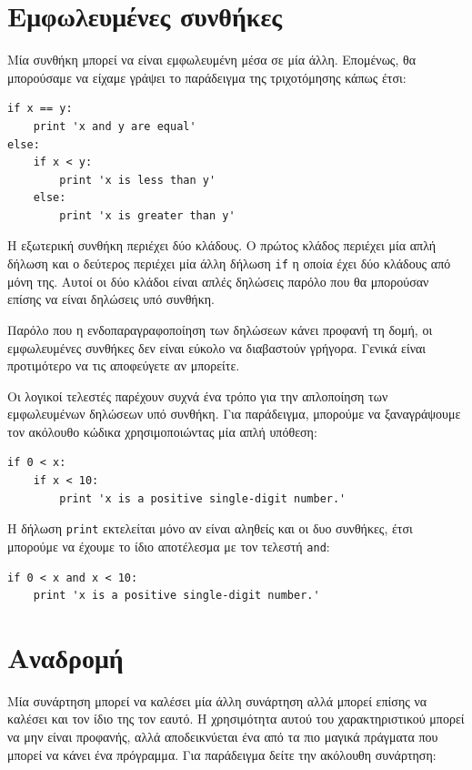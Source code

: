 \documentclass[10pt]{book}
\begin{document}
\section{Εμφωλευμένες συνθήκες}

Μία συνθήκη μπορεί να είναι εμφωλευμένη μέσα σε μία άλλη. Επομένως, θα μπορούσαμε να είχαμε γράψει το παράδειγμα της τριχοτόμησης κάπως έτσι:

\begin{verbatim}
if x == y:
    print 'x and y are equal'
else:
    if x < y:
        print 'x is less than y'
    else:
        print 'x is greater than y'
\end{verbatim}
%

Η εξωτερική συνθήκη περιέχει δύο κλάδους. Ο πρώτος κλάδος περιέχει μία απλή δήλωση και ο δεύτερος περιέχει μία άλλη δήλωση {\tt if} η οποία έχει δύο κλάδους από μόνη της. Αυτοί οι δύο κλάδοι είναι απλές δηλώσεις παρόλο που θα μπορούσαν επίσης να είναι δηλώσεις υπό συνθήκη.

Παρόλο που η ενδοπαραγραφοποίηση των δηλώσεων κάνει προφανή τη δομή, οι εμφωλευμένες συνθήκες δεν είναι εύκολο να διαβαστούν γρήγορα. Γενικά είναι προτιμότερο να τις αποφεύγετε αν μπορείτε.

Οι λογικοί τελεστές παρέχουν συχνά ένα τρόπο για την απλοποίηση των εμφωλευμένων δηλώσεων υπό συνθήκη. Για παράδειγμα, μπορούμε να ξαναγράψουμε τον ακόλουθο κώδικα χρησιμοποιώντας μία απλή υπόθεση:

\begin{verbatim}
if 0 < x:
    if x < 10:
        print 'x is a positive single-digit number.'
\end{verbatim}
%

Η δήλωση {\tt print} εκτελείται μόνο αν είναι αληθείς και οι δυο συνθήκες,
έτσι μπορούμε να έχουμε το ίδιο αποτέλεσμα με τον τελεστή {\tt and}:

\begin{verbatim}
if 0 < x and x < 10:
    print 'x is a positive single-digit number.'
\end{verbatim}


\section{Αναδρομή}
\label{recursion}


Μία συνάρτηση μπορεί να καλέσει μία άλλη συνάρτηση αλλά μπορεί επίσης να καλέσει και τον ίδιο της τον εαυτό. Η χρησιμότητα αυτού του χαρακτηριστικού μπορεί να μην είναι προφανής, αλλά αποδεικνύεται ένα από τα πιο μαγικά πράγματα που μπορεί να κάνει ένα πρόγραμμα. Για παράδειγμα δείτε την ακόλουθη συνάρτηση:
\end{document}

